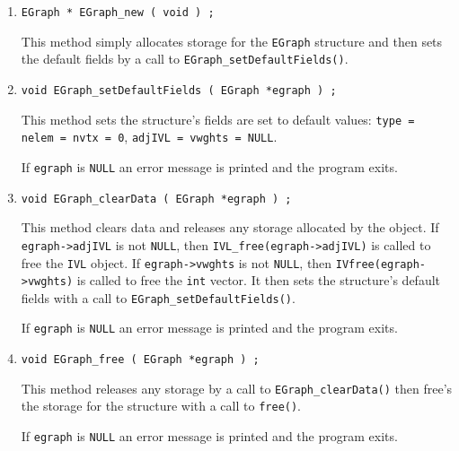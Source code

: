 \begin{enumerate}
\item
\begin{verbatim}
EGraph * EGraph_new ( void ) ;
\end{verbatim}
This method simply allocates storage for the {\tt EGraph} structure 
and then sets the default fields by a call to 
{\tt EGraph\_setDefaultFields()}.
\item
\begin{verbatim}
void EGraph_setDefaultFields ( EGraph *egraph ) ;
\end{verbatim}
This method sets the structure's fields are set to default values:
{\tt type = nelem = nvtx = 0}, {\tt adjIVL = vwghts = NULL}.
\par {}
If {\tt egraph} is {\tt NULL}
an error message is printed and the program exits.
\item
\begin{verbatim}
void EGraph_clearData ( EGraph *egraph ) ;
\end{verbatim}
This method clears data and releases any storage allocated by the
object.
If {\tt egraph->adjIVL} is not {\tt NULL}, 
then {\tt IVL\_free(egraph->adjIVL)} is called to free the {\tt IVL}
object.
If {\tt egraph->vwghts} is not {\tt NULL}, 
then {\tt IVfree(egraph->vwghts)} is called to free the {\tt int}
vector.
It then sets the structure's default fields 
with a call to {\tt EGraph\_setDefaultFields()}.
\par {}
If {\tt egraph} is {\tt NULL}
an error message is printed and the program exits.
\item
\begin{verbatim}
void EGraph_free ( EGraph *egraph ) ;
\end{verbatim}
This method releases any storage by a call to 
{\tt EGraph\_clearData()} then free's the storage for the 
structure with a call to {\tt free()}.
\par {}
If {\tt egraph} is {\tt NULL}
an error message is printed and the program exits.
\end{enumerate}
\par
